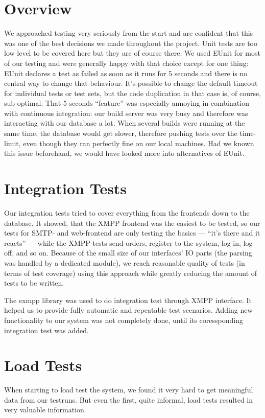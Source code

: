 \documentclass[11pt,a4paper]{report}
\begin{document}
\section{Overview}
We approached testing very seriously from the start and are confident that this
was one of the best decisions we made throughout the project. Unit tests are too
low level to be covered here but they are of course there. We used EUnit for
most of our testing and were generally happy with that choice except for one
thing: EUnit declares a test as failed as soon as it runs for 5 seconds and
there is no central way to change that behaviour. It's possible to change the
default timeout for individual tests or test sets, but the code duplication in
that case is, of course, sub-optimal.
That 5 seconds ``feature'' was especially annoying in combination with
continuous integration: our build server was very busy and therefore was
interacting with our database a lot. When several builds were running at the
same time, the database would get slower, therefore pushing tests over the
time-limit, even though they ran perfectly fine on our local machines. Had we
known this issue beforehand, we would have looked more into alternatives of
EUnit.

\section{Integration Tests}
Our integration tests tried to cover everything from the frontends down to the
database. It showed, that the XMPP frontend was the easiest to be tested, so
our tests for SMTP- and web-frontend are only testing the basics --- ``it's
there and it reacts'' --- while the XMPP tests send orders, register to the
system, log in, log off, and so on. Because of the small size of our interfaces' IO
parts (the parsing was handled by a dedicated module), we reach reasonable quality
of tests (in terms of test coverage) using this approach while greatly reducing the
amount of tests to be written.

The exmpp library\cite{exmpp} was used to do integration test through XMPP interface.
It helped us to provide fully automatic and repeatable test scenarios.
Adding new functionality to our system was not completely done, until its coressponding integration test was added.

\section{Load Tests}\label{load_tests}
When starting to load test the system,
we found it very hard to get meaningful data from our testruns.
But even the first, quite informal, load tests resulted in very valuable information.
\end{document}
